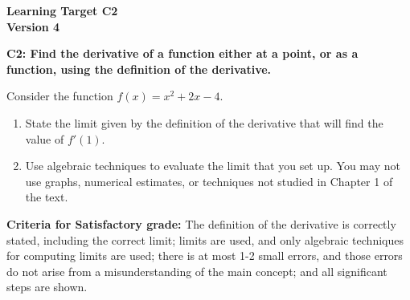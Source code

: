 \documentclass[10pt]{article}
\begin{document}
	\vspace*{0in}

		\begin{center}
			\textbf{Learning Target C2 \\
			Version 4} \\
		\end{center}


\begin{framed}
	\textbf{C2: Find the derivative of a function either at a point, or as a function, using the definition of the derivative.
}
\end{framed}

Consider the function $f(x) = x^2 + 2x - 4$. 

\begin{enumerate}
    \item State the limit given by the definition of the derivative that will find the value of $f'(1).$
    
    \vspace{1in} 
    
    
    \item Use algebraic techniques to evaluate the limit that you set up. You may not use graphs, numerical estimates, or techniques not studied in Chapter 1 of the text. 
\end{enumerate}



\vfill


\begin{small}
    \begin{framed}
        	\textbf{Criteria for Satisfactory grade:} The definition of the derivative is correctly stated, including the correct limit; limits are used, and only algebraic techniques for computing limits are used; there is at most 1-2 small errors, and those errors do not arise from a misunderstanding of the main concept; and all significant steps are shown. 
    \end{framed}

\end{small}
\end{document}
